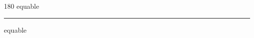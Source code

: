 
\begin{frame}
\begin{center}
\begin{turn}{180}
{\fontsize{2.5cm}{1em}\selectfont equable}
\end{turn}
\vspace{1em}\par  
\hrule
\vspace{1em}\par  
{\fontsize{2.5cm}{1em}\selectfont equable}
\end{center}
\end{frame}
